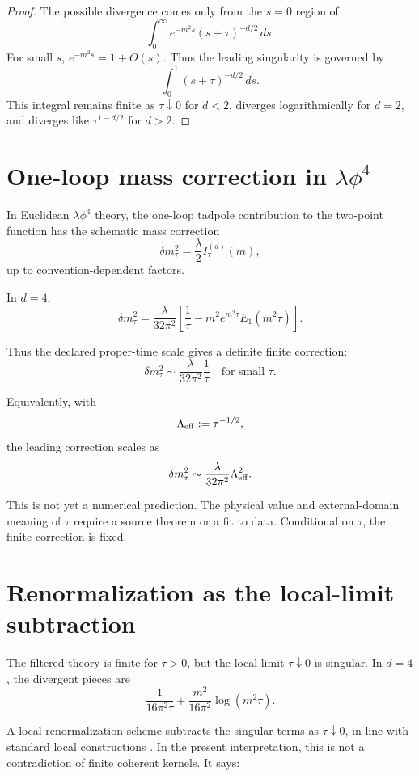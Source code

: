 \documentclass[11pt]{article}
\begin{document}
\begin{proof}
The possible divergence comes only from the \(s=0\) region of
\[
\int_0^\infty e^{-m^2s}(s+\tau)^{-d/2}\,ds.
\]
For small \(s\), \(e^{-m^2s}=1+O(s)\). Thus the leading singularity is governed by
\[
\int_0^1 (s+\tau)^{-d/2}\,ds.
\]
This integral remains finite as \(\tau\downarrow0\) for \(d<2\), diverges logarithmically for \(d=2\), and diverges like \(\tau^{1-d/2}\) for \(d>2\).
\end{proof}

\section{One-loop mass correction in \texorpdfstring{\(\lambda\phi^4\)}{lambda phi4}}

In Euclidean \(\lambda\phi^4\) theory, the one-loop tadpole contribution to the two-point function has the schematic mass correction
\[
\delta m_\tau^2
=
\frac{\lambda}{2} I_\tau^{(d)}(m),
\]
up to convention-dependent factors.

In \(d=4\),
\[
\delta m_\tau^2
=
\frac{\lambda}{32\pi^2}
\left[
\frac{1}{\tau}
-
m^2e^{m^2\tau}E_1(m^2\tau)
\right].
\]

Thus the declared proper-time scale gives a definite finite correction:
\[
\boxed{
\delta m_\tau^2
\sim
\frac{\lambda}{32\pi^2}\frac{1}{\tau}
\quad
\text{for small }\tau.
}
\]

Equivalently, with
\[
\Lambda_{\rm eff}:=\tau^{-1/2},
\]
the leading correction scales as
\[
\delta m_\tau^2
\sim
\frac{\lambda}{32\pi^2}\Lambda_{\rm eff}^2.
\]

\begin{remark}
This is not yet a numerical prediction.  The physical value and external-domain meaning of
\(\tau\) require a source theorem or a fit to data.  Conditional on \(\tau\), the finite
correction is fixed.
\end{remark}

\section{Renormalization as the local-limit subtraction}

The filtered theory is finite for \(\tau>0\), but the local limit \(\tau\downarrow0\) is singular. In \(d=4\), the divergent pieces are
\[
\frac{1}{16\pi^2\tau}
+
\frac{m^2}{16\pi^2}\log(m^2\tau).
\]

A local renormalization scheme subtracts the singular terms as \(\tau\downarrow0\), in line
with standard local constructions \cite{EpsteinGlaser1973}.  In the present interpretation,
this is not a contradiction of finite coherent kernels. It says:
\end{document}
